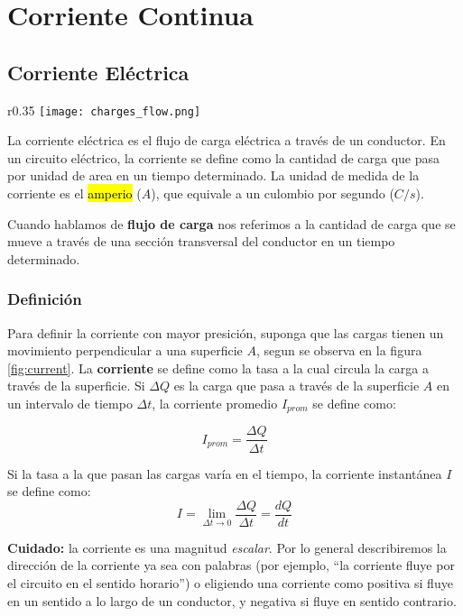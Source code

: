\section{Corriente Continua}

\subsection{Corriente Eléctrica}

\begin{wrapfigure}{r}{0.35\textwidth}
    \centering
    \texttt{[image: charges\_flow.png]}
    \caption{Cargas en movimiento a través de un área \(A\).}
    \label{fig:current}
\end{wrapfigure}

La corriente eléctrica es el flujo de carga eléctrica a través de un conductor. En un circuito eléctrico, la corriente se define como la cantidad de carga que pasa por unidad de area en un tiempo determinado. La unidad de medida de la corriente es el \hl{amperio} (\(A\)), que equivale a un culombio por segundo (\(C/s\)).

Cuando hablamos de \textbf{flujo de carga} nos referimos a la cantidad de carga que se mueve a través de una sección transversal del conductor en un tiempo determinado.

\subsubsection{Definición}

Para definir la corriente con mayor presición, suponga que las cargas tienen un movimiento perpendicular a una superficie \(A\), segun se observa en la figura \ref{fig:current}. La \textbf{corriente} se define como la tasa a la cual circula la carga a través de la superficie. Si \(\Delta Q\) es la carga que pasa a través de la superficie \(A\) en un intervalo de tiempo \(\Delta t\), la corriente promedio \(I_{prom}\) se define como:

\begin{equation}
    I_{prom} = \frac{\Delta Q}{\Delta t}
\end{equation}

Si la tasa a la que pasan las cargas varía en el tiempo, la corriente instantánea \(I\) se define como:
\[
    I = \lim_{\Delta t \to 0} \frac{\Delta Q}{\Delta t} = \frac{dQ}{dt}
\]

\begin{tcolorbox}[mydanger]
    \textbf{Cuidado:} la corriente es una magnitud \textit{escalar}. Por lo general describiremos la dirección de la corriente ya sea con palabras (por ejemplo, ``la corriente fluye por el circuito en el sentido horario'') o eligiendo una corriente como positiva si fluye en un sentido a lo largo de un conductor, y negativa si fluye en sentido contrario.
\end{tcolorbox}

